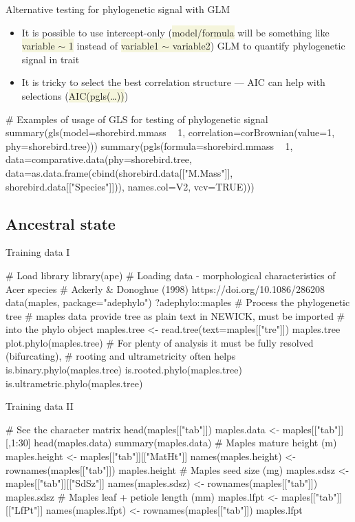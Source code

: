 \documentclass[compress, xelatex, 11pt, xcolor=svgnames, aspectratio=169,
	hyperref={
		bookmarks=true,
		unicode=true,
		colorlinks=true,
		pdftitle={Molecular data in R},
		plainpages=false,
		pdfauthor={Vojtech Zeisek},
		pdfsubject={Course about phylogeny and evolution in R},
		pdfcreator={XeLaTeX},
		pdfkeywords={R, evolution, phylogeny, molecular data},
		linkcolor=Crimson, %
		anchorcolor=Magenta, %
		citecolor=Magenta, %
		filecolor=Magenta, %
		menucolor=Magenta, %
		urlcolor=DodgerBlue, %
		},
	url={hyphens, lowtilde} %
	]{beamer}
\renewcommand{\texttt}[1]{\colorbox{Beige}{{\ttfamily #1}}}
\begin{document}
\begin{frame}[fragile]{Alternative testing for phylogenetic signal with GLM}
	\begin{itemize}
		\item It is possible to use intercept-only (\texttt{model/formula} will be something like \texttt{variable $\sim$ 1} instead of \texttt{variable1 $\sim$ variable2}) GLM to quantify phylogenetic signal in trait
		\item It is tricky to select the best correlation structure --- AIC can help with selections (\texttt{AIC(pgls(\ldots))})
	\end{itemize}
	\begin{spluscode}
    # Examples of usage of GLS for testing of phylogenetic signal
    summary(gls(model=shorebird.mmass ~ 1,
      correlation=corBrownian(value=1, phy=shorebird.tree)))
    summary(pgls(formula=shorebird.mmass ~ 1,
      data=comparative.data(phy=shorebird.tree,
      data=as.data.frame(cbind(shorebird.data[["M.Mass"]],
      shorebird.data[["Species"]])), names.col=V2, vcv=TRUE)))
	\end{spluscode}
\end{frame}

\subsection{Ancestral state}

\begin{frame}[fragile]{Training data I}
	\begin{spluscode}
    # Load library
    library(ape)
    # Loading data - morphological characteristics of Acer species
    # Ackerly & Donoghue (1998) https://doi.org/10.1086/286208
    data(maples, package="adephylo")
    ?adephylo::maples
    # Process the phylogenetic tree
    # maples data provide tree as plain text in NEWICK, must be imported
    # into the phylo object
    maples.tree <- read.tree(text=maples[["tre"]])
    maples.tree
    plot.phylo(maples.tree)
    # For plenty of analysis it must be fully resolved (bifurcating),
    # rooting and ultrametricity often helps
    is.binary.phylo(maples.tree)
    is.rooted.phylo(maples.tree)
    is.ultrametric.phylo(maples.tree)
	\end{spluscode}
\end{frame}

\begin{frame}[fragile]{Training data II}
	\begin{spluscode}
    # See the character matrix
    head(maples[["tab"]])
    maples.data <- maples[["tab"]][,1:30]
    head(maples.data)
    summary(maples.data)
    # Maples mature height (m)
    maples.height <- maples[["tab"]][["MatHt"]]
    names(maples.height) <- rownames(maples[["tab"]])
    maples.height
    # Maples seed size (mg)
    maples.sdsz  <- maples[["tab"]][["SdSz"]]
    names(maples.sdsz) <- rownames(maples[["tab"]])
    maples.sdsz
    # Maples leaf + petiole length (mm)
    maples.lfpt <- maples[["tab"]][["LfPt"]]
    names(maples.lfpt) <- rownames(maples[["tab"]])
    maples.lfpt
	\end{spluscode}
\end{frame}
\end{document}
